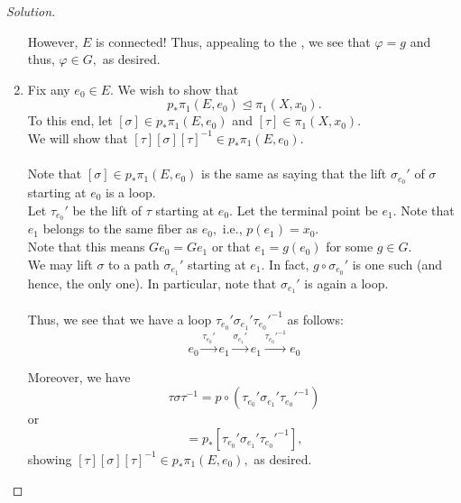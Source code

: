 \documentclass[12pt]{article}
\theoremstyle{definition}
\numberwithin{thm}{section}
\newenvironment{soln}{\begin{proof}[Solution]}{\end{proof}}
\begin{document}
\begin{soln}
\begin{enumerate}
		However, $E$ is connected! Thus, appealing to the , we see that $\varphi = g$ and thus, $\varphi \in G,$ as desired.
		\item Fix any $e_0 \in E.$ We wish to show that
		\begin{equation*} 
			p_*\pi_1(E, e_0) \unlhd \pi_1(X, x_0).
		\end{equation*}
		To this end, let $[\sigma] \in p_*\pi_1(E, e_0)$ and $[\tau] \in \pi_1(X, x_0).$\\
		We will show that $[\tau][\sigma][\tau]^{-1} \in p_*\pi_1(E, e_0).$\\~\\
		Note that $[\sigma] \in p_*\pi_1(E, e_0)$ is the same as saying that the lift $\sigma_{e_0}'$ of $\sigma$ starting at $e_0$ is a loop.\\
		Let $\tau_{e_0}'$ be the lift of $\tau$ starting at $e_0.$ Let the terminal point be $e_1.$ Note that $e_1$ belongs to the same fiber as $e_0,$ i.e., $p(e_1) = x_0.$ \\
		Note that this means $Ge_0 = Ge_1$ or that $e_1 = g(e_0)$ for some $g \in G.$\\
		We may lift $\sigma$ to a path $\sigma_{e_1}'$ starting at $e_1.$ In fact, $g\circ\sigma_{e_0}'$ is one such (and hence, the only one). In particular, note that $\sigma_{e_1}'$ is again a loop. \\~\\
		Thus, we see that we have a loop $\tau_{e_0}'\sigma_{e_1}'\tau_{e_0}'^{-1}$ as follows:
		\begin{equation*} 
			e_0 \overset{\tau_{e_0}'}{\longrightarrow} e_1 \overset{\sigma_{e_1}'}{\longrightarrow} e_1 \overset{\tau_{e_0}'^{-1}}{\longrightarrow} e_0
		\end{equation*}

		Moreover, we have
		\begin{equation*} 
			\tau\sigma\tau^{-1} = p\circ(\tau_{e_0}'\sigma_{e_1}'\tau_{e_0}'^{-1})
		\end{equation*}
		or
		\begin{equation*} 
			[\tau\sigma\tau^{-1}] = p_*[\tau_{e_0}'\sigma_{e_1}'\tau_{e_0}'^{-1}],
		\end{equation*}
		showing $[\tau][\sigma][\tau]^{-1} \in p_*\pi_1(E, e_0),$ as desired. \qedhere
	\end{enumerate}
\end{soln}
\end{document}
